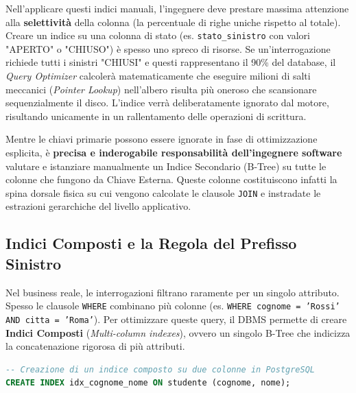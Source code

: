 \begin{warningbox}
Nell'applicare questi indici manuali, l'ingegnere deve prestare massima attenzione alla \textbf{selettività} della colonna (la percentuale di righe uniche rispetto al totale). 
Creare un indice su una colonna di stato (es. \texttt{stato\_sinistro} con valori "APERTO" o "CHIUSO") è spesso uno spreco di risorse. Se un'interrogazione richiede tutti i sinistri "CHIUSI" e questi rappresentano il 90\% del database, il \textit{Query Optimizer} calcolerà matematicamente che eseguire milioni di salti meccanici (\textit{Pointer Lookup}) nell'albero risulta più oneroso che scansionare sequenzialmente il disco. L'indice verrà deliberatamente ignorato dal motore, risultando unicamente in un rallentamento delle operazioni di scrittura.
\end{warningbox}

\begin{bestpractice}
Mentre le chiavi primarie possono essere ignorate in fase di ottimizzazione esplicita, è \textbf{precisa e inderogabile responsabilità dell'ingegnere software} valutare e istanziare manualmente un Indice Secondario (B-Tree) su tutte le colonne che fungono da Chiave Esterna. Queste colonne costituiscono infatti la spina dorsale fisica su cui vengono calcolate le clausole \texttt{JOIN} e instradate le estrazioni gerarchiche del livello applicativo.
\end{bestpractice}

\subsection{Indici Composti e la Regola del Prefisso Sinistro}

Nel business reale, le interrogazioni filtrano raramente per un singolo attributo. Spesso le clausole \texttt{WHERE} combinano più colonne (es. \texttt{WHERE cognome = 'Rossi' AND citta = 'Roma'}). 
Per ottimizzare queste query, il DBMS permette di creare \textbf{Indici Composti} (\textit{Multi-column indexes}), ovvero un singolo B-Tree che indicizza la concatenazione rigorosa di più attributi.

\begin{lstlisting}[language=SQL, basicstyle=\ttfamily\small, keywordstyle=\color{blue}\bfseries]
-- Creazione di un indice composto su due colonne in PostgreSQL
CREATE INDEX idx_cognome_nome ON studente (cognome, nome);
\end{lstlisting}


